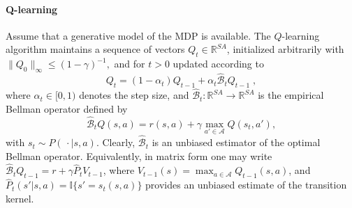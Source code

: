 \documentclass{article}
\numberwithin{equation}{section}
\newcommand{\cA}{\mathcal{A}}
\newcommand{\one}[1]{\mathbb{I}\{#1\}}
\begin{document}
\paragraph{Q-learning}
Assume that a generative model of the MDP is available. The $Q$-learning algorithm maintains a sequence of vectors \(Q_t \in \mathbb{R}^{SA}\), initialized arbitrarily with
\(\|Q_0\|_\infty \le (1-\gamma)^{-1},\)
and for \(t > 0\) updated according to
\begin{equation}\label{eq:q_learning_update}
    Q_{t} = (1 - \alpha_t) Q_{t-1} + \alpha_t  \widehat{\mathcal{B}}_t Q_{t-1}\;,
\end{equation}
where \(\alpha_t \in [0,1)\) denotes the step size, and \(\widehat{\mathcal{B}}_t : \mathbb{R}^{SA} \to \mathbb{R}^{SA}\) is the empirical Bellman operator defined by
\[
    \widehat{\mathcal{B}}_t Q(s,a) = r(s,a) + \gamma \max_{a'\in\cA} Q(s_t,a'),
\]
with \(s_t \sim P(\,\cdot\mid s,a)\). Clearly, \(\widehat{\mathcal{B}}_t\) is an unbiased estimator of the optimal Bellman operator.
Equivalently, in matrix form one may write \(\widehat{\mathcal{B}}_t Q_{t-1} = r+\gamma\widehat{P}_t V_{t-1}\), where \(V_{t-1}(s) = \max_{a\in\cA} Q_{t-1}(s,a)\), and \(\widehat{P}_t(s'| s,a) = \one{s' = s_t(s,a)}\) provides an unbiased estimate of the transition kernel. 
\end{document}
